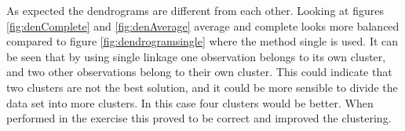 
As expected the dendrograms are different from each other.
Looking at figures \ref{fig:denComplete} and \ref{fig:denAverage} average and complete looks more balanced compared to figure \ref{fig:dendrogramsingle} where the method single is used. It can be seen that by using single linkage one observation belongs to its own cluster, and two other observations belong to their own cluster.
This could indicate that two clusters are not the best solution, and it could be more sensible to divide the data set into more clusters. In this case four clusters would be better. When performed in the exercise this proved to be correct and improved the clustering. 